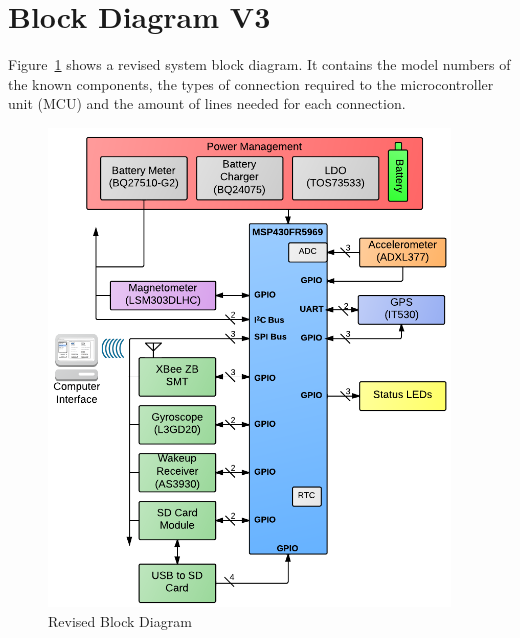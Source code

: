 \section{Block Diagram V3}

Figure~\ref{fig:blockDiagram} shows a revised system block diagram.  It contains the model numbers of the known components, the types of connection required to the microcontroller unit (MCU) and the amount of lines needed for each connection.

\begin{figure}[H]
	\centering
	\includegraphics[width=0.95\textwidth]{img/blockDiagramV3}
	\caption{Revised Block Diagram \label{fig:blockDiagram}}
\end{figure}


